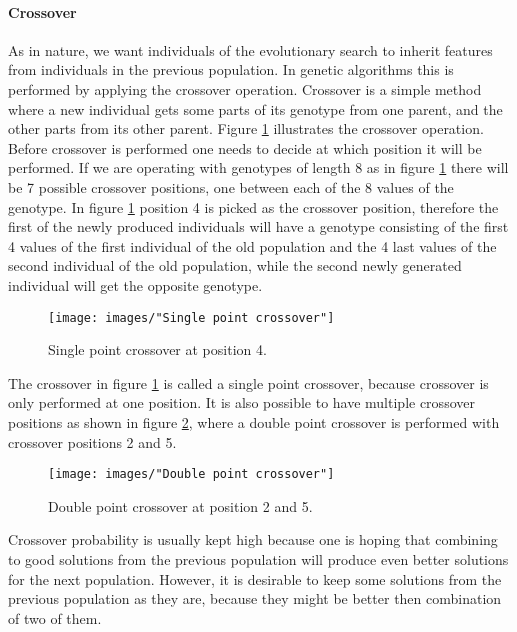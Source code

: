 \paragraph{Crossover}
As in nature, we want individuals of the evolutionary search to inherit features from individuals in the previous population. In genetic algorithms this is performed by applying the crossover operation. Crossover is a simple method where a new individual gets some parts of its genotype from one parent, and the other parts from its other parent. Figure \ref{Single point crossover} illustrates the crossover operation. Before crossover is performed one needs to decide at which position it will be performed. If we are operating with genotypes of length 8 as in figure \ref{Single point crossover} there will be 7 possible crossover positions, one between each of the 8 values of the genotype. In figure \ref{Single point crossover} position 4 is picked as the crossover position, therefore the first of the newly produced individuals will have a genotype consisting of the first 4 values of the first individual of the old population and the 4 last values of the second individual of the old population, while the second newly generated individual will get the opposite genotype.


\begin{figure}[h!]
\begin{center}
\texttt{[image: images/"Single point crossover"]}
\caption{Single point crossover at position 4.}
\label{Single point crossover}
\end{center}
\end{figure}


\noindent The crossover in figure \ref{Single point crossover} is called a single point crossover, because crossover is only performed at one position. It is also possible to have multiple crossover positions as shown in figure \ref{Double point crossover}, where a double point crossover is performed with crossover positions 2 and 5.


\begin{figure}[h!]
\begin{center}
\texttt{[image: images/"Double point crossover"]}
\caption{Double point crossover at position 2 and 5.}
\label{Double point crossover}
\end{center}
\end{figure}


\noindent Crossover probability is usually kept high because one is hoping that combining to good solutions from the previous population will produce even better solutions for the next population. However, it is desirable to keep some solutions from the previous population as they are, because they might be better then combination of two of them. \\


